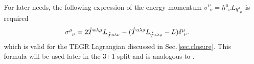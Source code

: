 \documentclass[
10pt, %
a4paper, %
oneside, %
twocolumn,
headinclude,footinclude, %
BCOR5mm, %
]{scrartcl}
\newcommand{\tetrsymbol}{h}
\newcommand{\tetr}[2]{\tetrsymbol^{#1}_{\phantom{#1}#2}}
\newcommand{\Laghodge}{L}%
\newcommand{\EMmat}[2]{\sigma^{#1}_{\ \,#2}}
\newcommand{\HDT}[1]{\accentset{\star}{T}^{#1}}
\newcommand{\Tscal}{\mathcal{T}}		%
\begin{document}
	
	For later needs, the following expression of the energy momentum $ \EMmat{\mu}{\nu} =
	\tetr{a}{\nu} \Laghodge_{\tetr{a}{\mu}} $ is required
	\begin{equation}\label{eqn.TEGR.vacuum}
		\EMmat{\mu}{\nu} 
		= 
		2 \HDT{a\lambda\mu}\Laghodge_{\HDT{a\lambda\nu}} - 
		(\HDT{a\lambda\rho}\Laghodge_{\HDT{a\lambda\rho}} - \Laghodge ) 
		\delta^\mu_{\ \nu}.
	\end{equation}
	which is valid for the TEGR Lagrangian discussed in Sec.\,\ref{sec.closure}. 
	This formula will be used later in the 3+1-split and is analogous to
	\cite[Eq.(10.13)]{AldrovandiPereiraBook}. 
	
\end{document}
